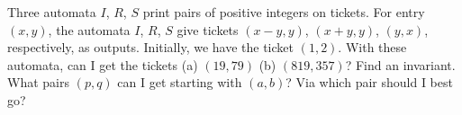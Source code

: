 Three automata $I$, $R$, $S$ print pairs of positive integers on tickets. For entry $(x, y)$, the automata $I$, $R$, $S$ give tickets $(x - y, y)$, $(x + y, y)$, $(y, x)$, respectively, as outputs. Initially, we have the ticket $(1, 2)$. With these automata, can I get the tickets (a) $(19, 79)$ (b) $(819, 357)$? Find an invariant. What pairs $(p, q)$ can I get starting with $(a, b)$? Via which pair should I best go?
